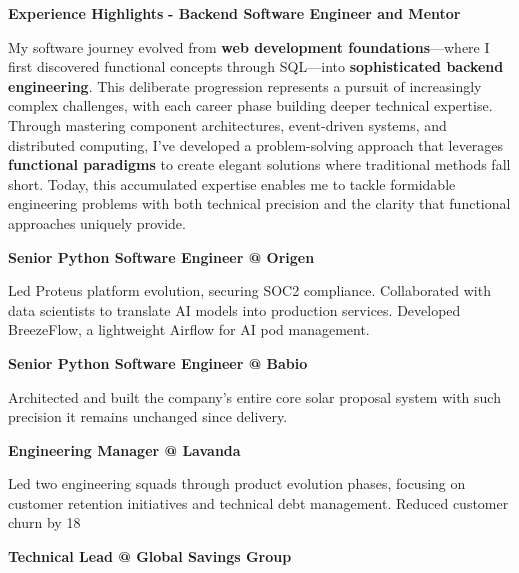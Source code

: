 \documentclass[a4paper,10pt]{article}
\begin{document}
\vspace{0.7cm}
\noindent
\begin{minipage}{\textwidth}
	{\large\bfseries\color{darkblue}\selectfont Experience Highlights}
	{\small\bfseries\color{darkblue}\selectfont - Backend Software Engineer and Mentor}
	\vspace{0.5cm}

	My software journey evolved from \textbf{web development foundations}—where I first discovered functional concepts through SQL—into \textbf{sophisticated backend engineering}. This deliberate progression represents a pursuit of increasingly complex challenges, with each career phase building deeper technical expertise. Through mastering component architectures, event-driven systems, and distributed computing, I've developed a problem-solving approach that leverages \textbf{functional paradigms} to create elegant solutions where traditional methods fall short. Today, this accumulated expertise enables me to tackle formidable engineering problems with both technical precision and the clarity that functional approaches uniquely provide.

	\vspace{0.7cm}
	\begin{minipage}{0.48\textwidth}
		\noindent\textbf{Senior Python Software Engineer @ Origen}

Led Proteus platform evolution, securing SOC2 compliance. Collaborated with data
        scientists to translate AI models into production services. Developed
        BreezeFlow, a lightweight Airflow for AI pod management.

		\vspace{0.3cm}
		\noindent\textbf{Senior Python Software Engineer @ Babio}

		Architected and built the company's entire core solar proposal system with such precision it remains unchanged since delivery.

		\vspace{0.3cm}
		\noindent\textbf{Engineering Manager @ Lavanda}

		Led two engineering squads through product evolution phases, focusing on customer retention initiatives and technical debt management. Reduced customer churn by 18%
	\end{minipage}
	\hfill
	\begin{minipage}{0.48\textwidth}
		\noindent\textbf{Technical Lead @ Global Savings Group}


\end{minipage}
\end{minipage}
\end{document}
